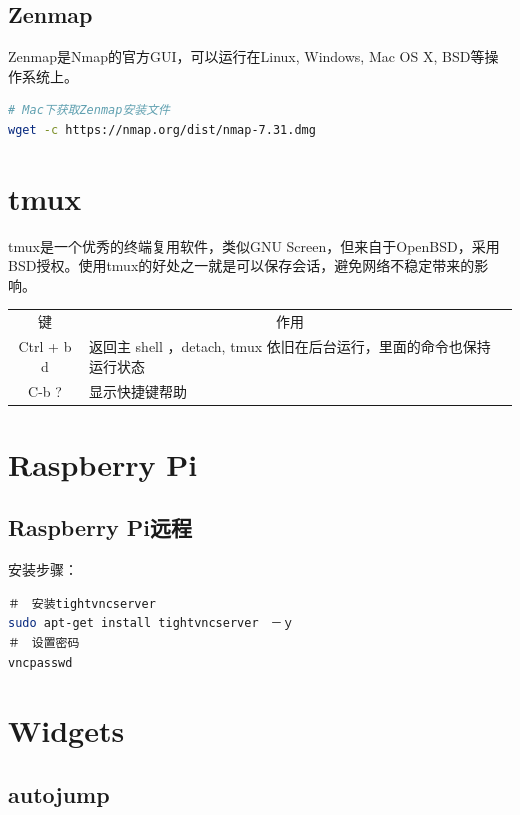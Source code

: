 \documentclass[letter]{book}
\begin{document}
\subsection{Zenmap}

Zenmap是Nmap的官方GUI，可以运行在Linux, Windows, Mac OS X, BSD等操作系统上。

\begin{lstlisting}[language=Bash]
# Mac下获取Zenmap安装文件
wget -c https://nmap.org/dist/nmap-7.31.dmg
\end{lstlisting}


\section{tmux}

tmux是一个优秀的终端复用软件，类似GNU Screen，但来自于OpenBSD，采用BSD授权。使用tmux的好处之一就是可以保存会话，避免网络不稳定带来的影响。

\begin{tabular}{|c|p{8cm}|c|}
	\hline
	\multirow{1}{*}{键}
	& \multicolumn{1}{c|}{作用}  \\			
	\cline{1-2}
	Ctrl + b d  & 返回主 shell ，detach, tmux 依旧在后台运行，里面的命令也保持运行状态\\
	\hline
	C-b ? & 显示快捷键帮助\\
	\hline
\end{tabular}


\section{Raspberry Pi}

\subsection{Raspberry Pi远程}

安装步骤：

\begin{lstlisting}[language=Bash]
＃　安装tightvncserver
sudo apt-get install tightvncserver　－ｙ
＃　设置密码
vncpasswd
\end{lstlisting}

\section{Widgets}

\subsection{autojump}
\end{document}
